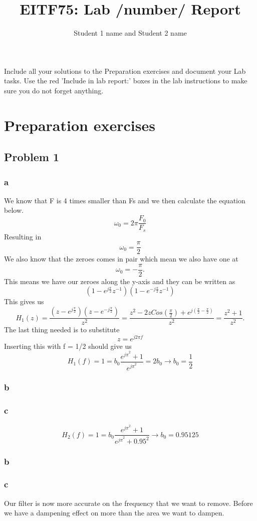\documentclass[a4paper,11pt]{article}
\title{EITF75: Lab /number/ Report}
\author{Student 1 name and Student 2 name}
\begin{document}
\raggedright
\maketitle
Include all your solutions to the Preparation exercises and document your Lab 
tasks. Use the red 'Include in lab report:' boxes in the lab instructions to make 
sure you do not forget anything.
\section{Preparation exercises}
\subsection{Problem 1}
\subsubsection{a}

We know that F is 4 times smaller than Fs and we then calculate the equation below. 
\[
\omega_{0} = 2 \pi \frac{F_{0}}{F_{s}} 
\]
Resulting in
\[
\omega_{0} = \frac{\pi}{2}
\]
We also know that the zeroes comes in pair which mean we also have one at 
\[
\omega_{0} = -\frac{\pi}{2}.
\]
This means we have our zeroes along the y-axis and they can be written as
\[
(1-e^{j\frac{\pi}{2}}z^{-1})(1-e^{-j\frac{\pi}{2}}z^{-1})
\]
This gives us
\[
H_{1}(z) = \frac{(z-e^{j\frac{\pi}{2}})(z-e^{-j\frac{\pi}{2}})}{z^2} = \frac{z^2-2zCos(\frac{\pi}{2})+e^{j(\frac{\pi}{2}-\frac{\pi}{2})}}{z^2} = \frac{z^2+1}{z^2}.
\]
The last thing needed is to substitute 
\[
z = e^{j2\pi f} 
\]
Inserting this with f = 1/2 should give us 
\[
H_{1}(f) = 1 =  b_0\frac{e^{j\pi}^2 + 1}{e^{j\pi}^2} = 2b_0 \xrightarrow{} b_0 = \frac{1}{2}
\]
\subsubsection{b}
\subsubsection{c}
\[
H_{2}(f) = 1 =  b_0\frac{e^{j\pi}^2 + 1}{e^{j\pi}^2 + 0.95^2} \xrightarrow{} b_0 = 0.95125
\]
\subsubsection{b}
\subsubsection{c}
Our filter is now more accurate on the frequency that we want to remove. Before we have a dampening effect on more than the area we want to dampen. 
\end{document}
